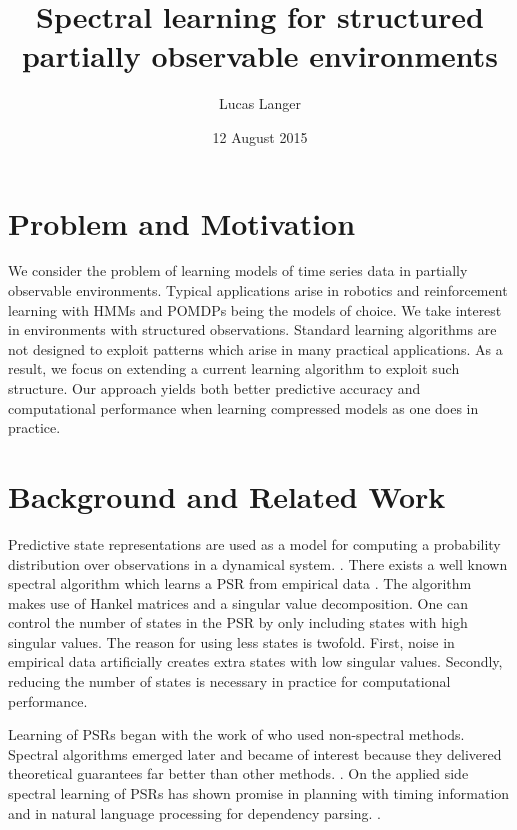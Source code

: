 \documentclass{acm_proc_article-sp}
\begin{document}
\title{Spectral learning for structured partially observable environments}


\author{
\alignauthor
Lucas Langer\\
}

\date{12 August 2015}

\maketitle

\section{Problem and Motivation}

We consider the problem of learning models of time series data in partially observable environments. Typical applications arise in robotics and reinforcement learning with HMMs and POMDPs being the models of choice. We take  interest in environments with structured observations. Standard learning algorithms are not designed to exploit patterns which arise in many practical applications. As a result, we focus on extending a current learning algorithm to exploit such structure. Our approach yields both better predictive accuracy and computational performance when learning compressed models as one does in practice. 

\section{Background and Related Work}

Predictive state representations are used as a model for computing a probability distribution over observations in a dynamical system. \cite{littman2001predictive}. There exists a well known spectral algorithm which learns a PSR from empirical data \cite{boots2010closing}. The algorithm makes use of Hankel matrices and a singular value decomposition. One can control the number of states in the PSR by only including states with high singular values. The reason for using less states is twofold. First, noise in empirical data artificially creates extra states with low singular values. Secondly, reducing the number of states is necessary in practice for computational performance. 

Learning of PSRs began with the work of \cite{DBLP:conf/icml/Wiewiora05} who used non-spectral methods. Spectral algorithms emerged later and became of interest because they delivered theoretical guarantees far better than other methods. \cite{boots2010closing}. On the applied side spectral learning of PSRs has shown promise in  planning with timing information \cite{pierrelucplanning2015} and in natural language processing for dependency parsing. \cite{balle2013spectral}.
\end{document}
